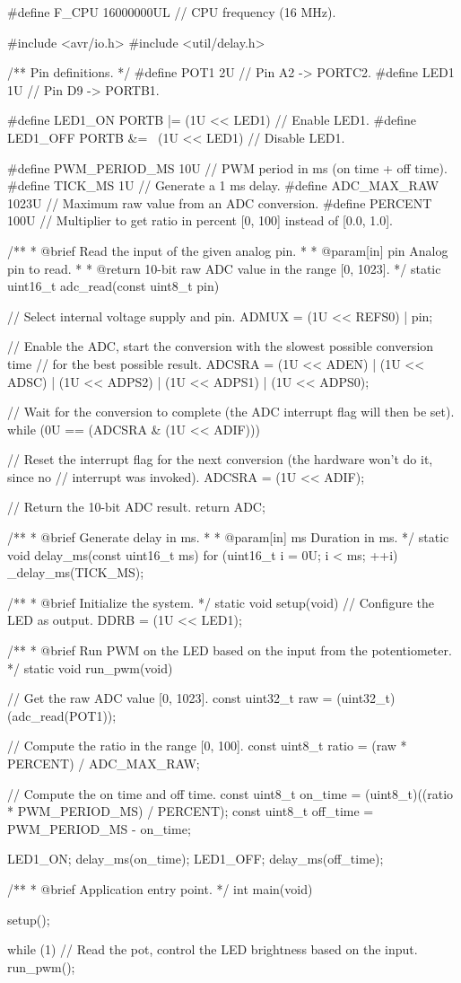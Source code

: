 \begin{ccode}
#define F_CPU 16000000UL // CPU frequency (16 MHz).

#include <avr/io.h>
#include <util/delay.h>

/** Pin definitions. */
#define POT1 2U // Pin A2 -> PORTC2.
#define LED1 1U // Pin D9 -> PORTB1.

#define LED1_ON PORTB |= (1U << LED1)   // Enable LED1.
#define LED1_OFF PORTB &= ~(1U << LED1) // Disable LED1.

#define PWM_PERIOD_MS 10U // PWM period in ms (on time + off time).
#define TICK_MS 1U        // Generate a 1 ms delay.
#define ADC_MAX_RAW 1023U // Maximum raw value from an ADC conversion.
#define PERCENT 100U      // Multiplier to get ratio in percent [0, 100] instead of [0.0, 1.0].

/**
 * @brief Read the input of the given analog pin.
 *
 * @param[in] pin Analog pin to read.
 * 
 * @return 10-bit raw ADC value in the range [0, 1023].
 */
static uint16_t adc_read(const uint8_t pin)
{
    // Select internal voltage supply and pin.
    ADMUX = (1U << REFS0) | pin;

    // Enable the ADC, start the conversion with the slowest possible conversion time
    // for the best possible result.
    ADCSRA = (1U << ADEN) | (1U << ADSC) | (1U << ADPS2) | (1U << ADPS1) | (1U << ADPS0);

    // Wait for the conversion to complete (the ADC interrupt flag will then be set).
    while (0U == (ADCSRA & (1U << ADIF))) {}

    // Reset the interrupt flag for the next conversion (the hardware won't do it, since no
    // interrupt was invoked).
    ADCSRA = (1U << ADIF);

    // Return the 10-bit ADC result.
    return ADC;
}

/**
 * @brief Generate delay in ms.
 * 
 * @param[in] ms Duration in ms.
 */
static void delay_ms(const uint16_t ms)
{
    for (uint16_t i = 0U; i < ms; ++i)
    {
        _delay_ms(TICK_MS);
    }
}

/**
 * @brief Initialize the system.
 */
static void setup(void)
{
    // Configure the LED as output.
    DDRB = (1U << LED1);
}

/**
 * @brief Run PWM on the LED based on the input from the potentiometer.
 */
static void run_pwm(void)
{
    // Get the raw ADC value [0, 1023].
    const uint32_t raw = (uint32_t)(adc_read(POT1));

    // Compute the ratio in the range [0, 100].
    const uint8_t ratio = (raw * PERCENT) / ADC_MAX_RAW;

    // Compute the on time and off time.
    const uint8_t on_time  = (uint8_t)((ratio * PWM_PERIOD_MS) / PERCENT);
    const uint8_t off_time = PWM_PERIOD_MS - on_time;

    LED1_ON;
    delay_ms(on_time);
    LED1_OFF;
    delay_ms(off_time);
}

/**
 * @brief Application entry point.
 */
int main(void)
{
    setup();

    while (1) 
    {
        // Read the pot, control the LED brightness based on the input.
        run_pwm();
    }
}
\end{ccode}

